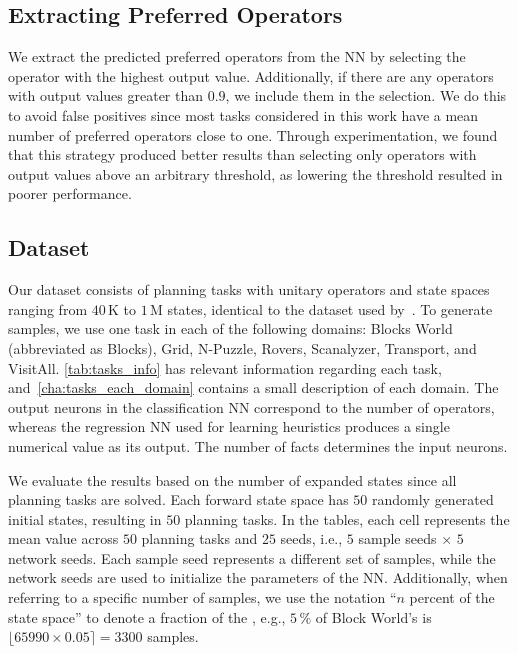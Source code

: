 \documentclass[ppgc,diss,english]{iiufrgs}
\begin{document}
\subsection{Extracting Preferred Operators}
\label{sec:exp-extracting-pos}
We extract the predicted preferred operators from the NN by selecting the operator with the highest output value. Additionally, if there are any operators with output values greater than $0.9$, we include them in the selection. We do this to avoid false positives since most tasks considered in this work have a mean number of preferred operators close to one. Through experimentation, we found that this strategy produced better results than selecting only operators with output values above an arbitrary threshold, as lowering the threshold resulted in poorer performance.


\subsection{Dataset}
\label{sec:exp-dataset}
Our dataset consists of planning tasks with unitary operators and state spaces ranging from $40$\,K to $1$\,M states, identical to the dataset used by~\citet{Bettker.etal/2022}. To generate samples, we use one task in each of the following domains: Blocks World (abbreviated as Blocks), Grid, N-Puzzle, Rovers, Scanalyzer, Transport, and VisitAll. \cref{tab:tasks_info} has relevant information regarding each task, and~\vref{cha:tasks_each_domain} contains a small description of each domain. The output neurons in the classification NN correspond to the number of operators, whereas the regression NN used for learning heuristics produces a single numerical value as its output. The number of facts determines the input neurons.

We evaluate the results based on the number of expanded states since all planning tasks are solved. Each forward state space \fsp has $50$ randomly generated initial states, resulting in $50$ planning tasks. %
In the tables, each cell represents the mean value across $50$ planning tasks and $25$ seeds, i.e., $5$ sample seeds $\times$ $5$ network seeds. Each sample seed represents a different set of samples, while the network seeds are used to initialize the parameters of the NN.
Additionally, when referring to a specific number of samples, we use the notation ``$n$ percent of the state space'' to denote a fraction of the \fsp, e.g., $5\,\%$ of Block World's \fsp is $\lfloor 65990 \times 0.05 \rceil = 3300$ samples.
\end{document}
